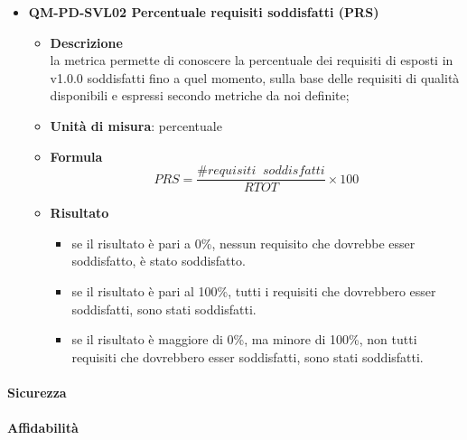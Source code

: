 \begin{itemize}
\begin{itemize}
                                \newline
                                \newline
                        \end{itemize}
                    \item\textbf{QM-PD-SVL02 Percentuale requisiti soddisfatti (PRS)}
                        \begin{itemize}
                            \item\textbf{Descrizione}\\
                                la metrica permette di conoscere la percentuale dei requisiti di esposti in  v1.0.0 soddisfatti fino a quel momento, sulla base delle requisiti di qualità disponibili e espressi secondo metriche da noi definite;\\
                            \item\textbf{Unità di misura}: percentuale
                            \item\textbf{Formula}\\
                                \[PRS = \frac{\mathit{\#requisiti\;\;soddisfatti}}{\mathit{RTOT}} \times 100 \]
                            \item\textbf{Risultato}\\
                                \begin{itemize}
                                    \item se il risultato è pari a 0\%, nessun requisito che dovrebbe esser soddisfatto, è stato soddisfatto.
                                    \item se il risultato è pari al 100\%, tutti i requisiti che dovrebbero esser soddisfatti,  sono stati soddisfatti.
                                    \item se il risultato è maggiore di 0\%, ma minore di 100\%, non tutti requisiti che dovrebbero esser soddisfatti, sono stati soddisfatti.
                                \end{itemize}
                        \end{itemize}
                \end{itemize}
\iffalse
            \paragraph{Sicurezza}
            \paragraph{Affidabilità}
